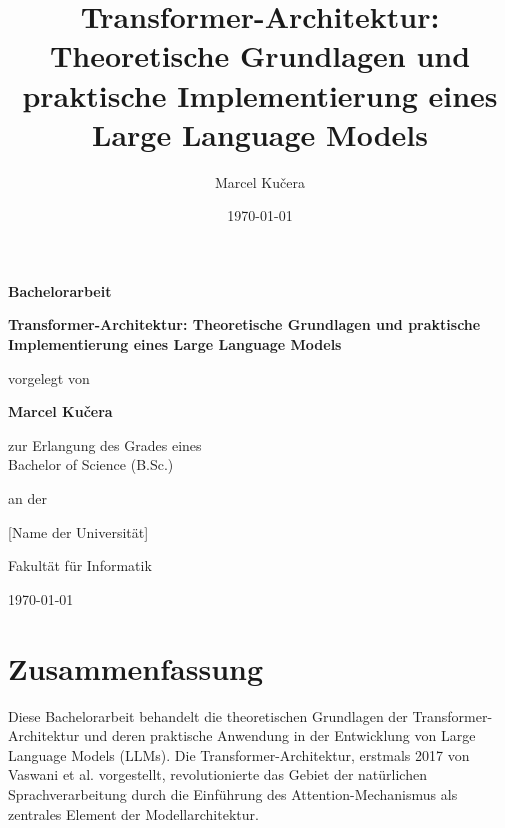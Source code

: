 \documentclass[12pt,a4paper,oneside]{report}
\title{Transformer-Architektur: Theoretische Grundlagen und praktische Implementierung eines Large Language Models}
\author{Marcel Kučera}
\date{\today}
\begin{document}
\begin{titlepage}
    \centering
    \vspace*{2cm}
    
    {\LARGE\bfseries Bachelorarbeit}
    
    \vspace{1.5cm}
    
    {\huge\bfseries Transformer-Architektur: Theoretische Grundlagen und praktische Implementierung eines Large Language Models}
    
    \vspace{2cm}
    
    {\Large vorgelegt von}
    
    \vspace{0.5cm}
    
    {\Large\bfseries Marcel Kučera}
    
    \vspace{2cm}
    
    {\large zur Erlangung des Grades eines\\
    Bachelor of Science (B.Sc.)}
    
    \vspace{1.5cm}
    
    {\large an der}
    
    \vspace{0.5cm}
    
    {\Large [Name der Universität]}
    
    \vspace{0.5cm}
    
    {\large Fakultät für Informatik}
    
    \vfill
    
    {\large\today}
\end{titlepage}

\chapter*{Zusammenfassung}

Diese Bachelorarbeit behandelt die theoretischen Grundlagen der Transformer-Architektur und deren praktische Anwendung in der Entwicklung von Large Language Models (LLMs). Die Transformer-Architektur, erstmals 2017 von Vaswani et al. vorgestellt, revolutionierte das Gebiet der natürlichen Sprachverarbeitung durch die Einführung des Attention-Mechanismus als zentrales Element der Modellarchitektur.
\end{document}
